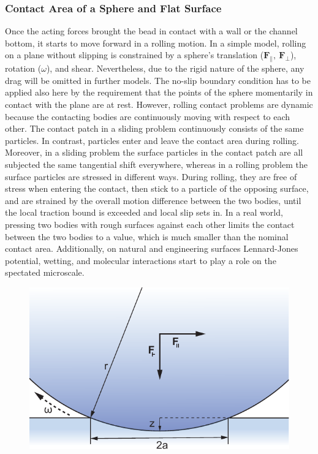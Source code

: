 \subsubsection{Contact Area of a Sphere and Flat Surface}
Once the acting forces brought the bead in contact with a wall or the channel bottom, it starts to move forward in a rolling motion. In a simple model, rolling on a plane without slipping is constrained by a sphere's translation ($\mathbf{F}_\parallel,\ \mathbf{F}_\perp$), rotation ($\omega$), and shear. Nevertheless, due to the rigid nature of the sphere, any drag will be omitted in further models.\cite{lit:fluid:rolling:rigid_viscoelastic} The no-slip boundary condition has to be applied also here by the requirement that the points of the sphere momentarily in contact with the plane are at rest. \newline However, rolling contact problems are dynamic because the contacting bodies are continuously moving with respect to each other. The contact patch in a sliding problem continuously consists of the same particles. In contrast, particles enter and leave the contact area during rolling. Moreover, in a sliding problem the surface particles in the contact patch are all subjected the same tangential shift everywhere, whereas in a rolling problem the surface particles are stressed in different ways. During rolling, they are free of stress when entering the contact, then stick to a particle of the opposing surface, and are strained by the overall motion difference between the two bodies, until the local traction bound is exceeded and local slip sets in.\cite{lit:fluid:rolling:contact_phenomena} \newline
In a real world, pressing two bodies with rough surfaces against each other limits the contact between the two bodies to a value, which is much smaller than the nominal contact area. Additionally, on natural and engineering surfaces Lennard-Jones potential, wetting, and molecular interactions start to play a role on the spectated microscale.\cite{lit:fluid:rolling:contact_ground_plane}

\begin{figure}[tbph!]
	\centering
	\includegraphics[width=0.7\linewidth]{Ressources/Fluidic/Rolling.pdf}
	\label{fig::fluidic:rolling_mechanics}
\end{figure}

